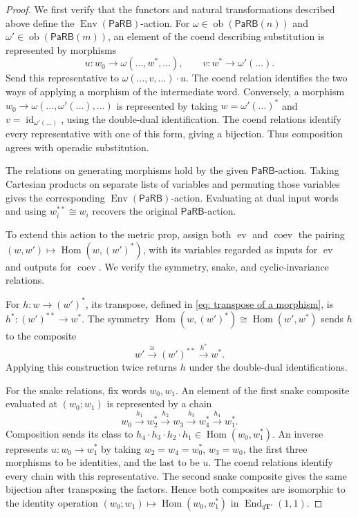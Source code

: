 \documentclass{amsart}
\newcommand{\bT}{\mathbf{T}}
\newcommand{\PaRB}{\mathsf{PaRB}}
\newcommand{\id}{\operatorname{id}}
\newcommand{\End}{\operatorname{End}}
\newcommand{\Hom}{\operatorname{Hom}}
\newcommand{\ob}{\operatorname{ob}}
\newcommand{\ev}{\operatorname{ev}}
\newcommand{\coev}{\operatorname{coev}}
\newcommand{\Env}{\operatorname{Env}}
\theoremstyle{definition}
\numberwithin{equation}{section}
\begin{document}
\begin{proof}
We first verify that the functors and natural transformations
described above define the $\Env(\PaRB)$-action.
For $\omega\in\ob(\PaRB(n))$ and
$\omega'\in\ob(\PaRB(m))$, an element of the coend describing
substitution is represented by morphisms
\[
u\colon w_0\longrightarrow\omega(\ldots,w^*,\ldots),
\qquad
v\colon w^*\longrightarrow\omega'(\ldots).
\]
Send this representative to $\omega(\ldots,v,\ldots)\cdot u$.
The coend relation identifies the two ways of applying a morphism
of the intermediate word. Conversely, a morphism
$w_0\to\omega(\ldots,\omega'(\ldots),\ldots)$ is represented
by taking $w=\omega'(\ldots)^*$ and
$v=\id_{\omega'(\ldots)}$, using the double-dual identification.
The coend relations identify every representative with one of
this form, giving a bijection.
Thus composition agrees with operadic substitution.

The relations on generating morphisms hold by the given
$\PaRB$-action. Taking Cartesian products on separate lists of
variables and permuting those variables gives the corresponding
$\Env(\PaRB)$-action. Evaluating at dual input words and using
$w_i^{**}\cong w_i$ recovers the original $\PaRB$-action.

To extend this action to the metric prop, assign both $\ev$
and $\coev$ the pairing
$(w,w')\mapsto\Hom(w,(w')^*)$, with its variables regarded
as inputs for $\ev$ and outputs for $\coev$.
We verify the symmetry, snake, and cyclic-invariance relations.

For $h\colon w\to(w')^*$, its transpose, defined in
\eqref{eq: transpose of a morphism}, is
$h^*\colon(w')^{**}\to w^*$.
The symmetry $\Hom(w,(w')^*)\cong\Hom(w',w^*)$ sends $h$
to the composite
\[
w'\xrightarrow{\cong}(w')^{**}\xrightarrow{h^*}w^*.
\]
Applying this construction twice returns $h$ under the
double-dual identifications.

For the snake relations, fix words $w_0,w_1$. An element of
the first snake composite evaluated at $(w_0;w_1)$ is
represented by a chain
\[
w_0\xrightarrow{h_1}w_2^*
\xrightarrow{h_2}w_3
\xrightarrow{h_3}w_4^*
\xrightarrow{h_4}w_1^*.
\]
Composition sends its class to
$h_4\cdot h_3\cdot h_2\cdot h_1\in\Hom(w_0,w_1^*)$.
An inverse represents $u\colon w_0\to w_1^*$ by taking
$w_2=w_4=w_0^*$, $w_3=w_0$, the first three morphisms to
be identities, and the last to be $u$.
The coend relations identify every chain with this representative.
The second snake composite gives the same bijection after
transposing the factors. Hence both composites are isomorphic
to the identity operation
$(w_0;w_1)\mapsto\Hom(w_0,w_1^*)$
in $\End_{q\bT'}(1,1)$.


\end{proof}
\end{document}
